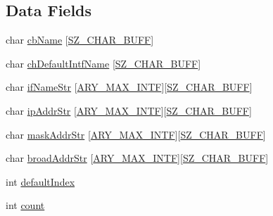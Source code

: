 \subsection*{Data Fields}
\begin{DoxyCompactItemize}
\item 
char \hyperlink{struct__ip_broadcast_array_a0f592bd31dcc3ce00a349f04ff6bd1ba}{cb\+Name} \mbox{[}\hyperlink{skn__common__headers_8h_a8d2978ad614b0de81c60483e706d9306}{S\+Z\+\_\+\+C\+H\+A\+R\+\_\+\+B\+U\+F\+F}\mbox{]}
\item 
char \hyperlink{struct__ip_broadcast_array_a06dab8742df19b5aec8538842617778d}{ch\+Default\+Intf\+Name} \mbox{[}\hyperlink{skn__common__headers_8h_a8d2978ad614b0de81c60483e706d9306}{S\+Z\+\_\+\+C\+H\+A\+R\+\_\+\+B\+U\+F\+F}\mbox{]}
\item 
char \hyperlink{struct__ip_broadcast_array_a193b90f271c061e8bf1593bab6a182c9}{if\+Name\+Str} \mbox{[}\hyperlink{skn__common__headers_8h_a00b19837422a3b13d82b9a525e92ef51}{A\+R\+Y\+\_\+\+M\+A\+X\+\_\+\+I\+N\+T\+F}\mbox{]}\mbox{[}\hyperlink{skn__common__headers_8h_a8d2978ad614b0de81c60483e706d9306}{S\+Z\+\_\+\+C\+H\+A\+R\+\_\+\+B\+U\+F\+F}\mbox{]}
\item 
char \hyperlink{struct__ip_broadcast_array_a96891ccc707337890b2a166e3ef3a8e1}{ip\+Addr\+Str} \mbox{[}\hyperlink{skn__common__headers_8h_a00b19837422a3b13d82b9a525e92ef51}{A\+R\+Y\+\_\+\+M\+A\+X\+\_\+\+I\+N\+T\+F}\mbox{]}\mbox{[}\hyperlink{skn__common__headers_8h_a8d2978ad614b0de81c60483e706d9306}{S\+Z\+\_\+\+C\+H\+A\+R\+\_\+\+B\+U\+F\+F}\mbox{]}
\item 
char \hyperlink{struct__ip_broadcast_array_a9241c1fbfb22a3ecfe4777863a063eb3}{mask\+Addr\+Str} \mbox{[}\hyperlink{skn__common__headers_8h_a00b19837422a3b13d82b9a525e92ef51}{A\+R\+Y\+\_\+\+M\+A\+X\+\_\+\+I\+N\+T\+F}\mbox{]}\mbox{[}\hyperlink{skn__common__headers_8h_a8d2978ad614b0de81c60483e706d9306}{S\+Z\+\_\+\+C\+H\+A\+R\+\_\+\+B\+U\+F\+F}\mbox{]}
\item 
char \hyperlink{struct__ip_broadcast_array_af40943e174ba847fa0218cfa6051e277}{broad\+Addr\+Str} \mbox{[}\hyperlink{skn__common__headers_8h_a00b19837422a3b13d82b9a525e92ef51}{A\+R\+Y\+\_\+\+M\+A\+X\+\_\+\+I\+N\+T\+F}\mbox{]}\mbox{[}\hyperlink{skn__common__headers_8h_a8d2978ad614b0de81c60483e706d9306}{S\+Z\+\_\+\+C\+H\+A\+R\+\_\+\+B\+U\+F\+F}\mbox{]}
\item 
int \hyperlink{struct__ip_broadcast_array_a5822ff77ae9f31bd3b4298d463c02f1f}{default\+Index}
\item 
int \hyperlink{struct__ip_broadcast_array_a971377a4c995292b8bd908f185cfc844}{count}
\end{DoxyCompactItemize}


